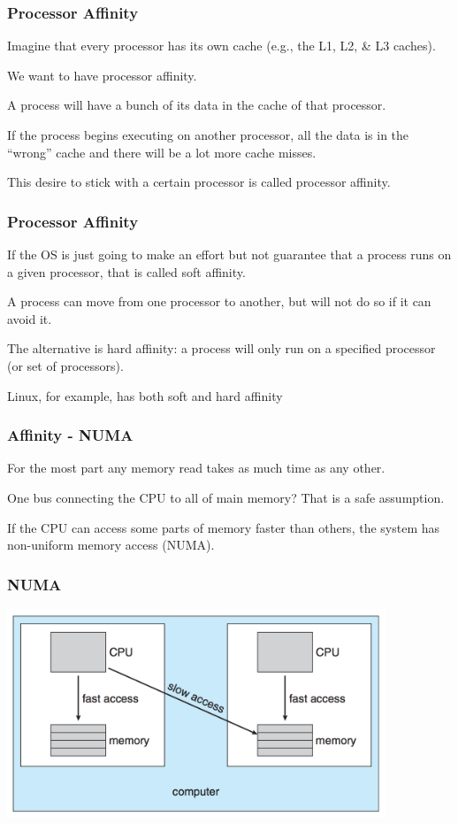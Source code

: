 \begin{frame}
\frametitle{Processor Affinity}

Imagine that every processor has its own cache (e.g., the L1, L2, \& L3 caches).

We want to have \alert{processor affinity}. 

A process will have a bunch of its data in the cache of that processor. 

If the process begins executing on another processor, all the data is in the ``wrong'' cache and there will be a lot more cache misses. 

This desire to stick with a certain processor is called processor affinity.


\end{frame}

\begin{frame}
\frametitle{Processor Affinity}

If the OS is just going to make an effort but not guarantee that a process runs on a given processor, that is called \alert{soft affinity}. 

A process can move from one processor to another, but will not do so if it can avoid it. 

The alternative is \alert{hard affinity}: a process will only run on a specified processor (or set of processors). 

Linux, for example, has both soft and hard affinity

\end{frame}

\begin{frame}
\frametitle{Affinity - NUMA}

For the most part any memory read takes as much time as any other. 

One bus connecting the CPU to all of main memory? That is a safe assumption.

  If the CPU can access some parts of memory faster than others, the system has \alert{non-uniform memory access} (NUMA).

\end{frame}

\begin{frame}
\frametitle{NUMA}

\begin{center}
	\includegraphics[width=0.85\textwidth]{images/numa.png}
\end{center}

\end{frame}

